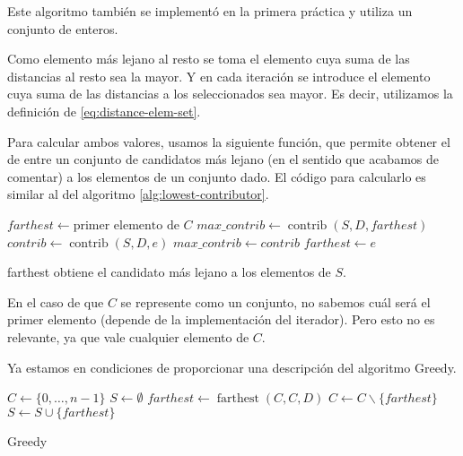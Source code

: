 \documentclass{article}
\begin{document}
Este algoritmo también se implementó en la primera práctica y utiliza un conjunto de enteros.

Como elemento más lejano al resto se toma el elemento cuya suma de las distancias al resto sea la mayor. Y en cada iteración se introduce el elemento
cuya suma de las distancias a los seleccionados sea mayor. Es decir, utilizamos la definición de \eqref{eq:distance-elem-set}.

Para calcular ambos valores, usamos la siguiente función, que permite obtener el de entre
un conjunto de candidatos más lejano (en el sentido que acabamos de comentar) a los elementos de un conjunto dado.
El código para calcularlo es similar al del algoritmo \ref{alg:lowest-contributor}.

\begin{algorithm}[H]
	\DontPrintSemicolon %
	$farthest \gets \text{primer elemento de } C$\;
	$max\_contrib \gets \operatorname{contrib}(S,D,farthest)$\;
	 {
		$contrib \gets \operatorname{contrib}(S,D,e)$\;
		 { 
			$max\_contrib \gets contrib$\;
			$farthest \gets e$ 
		}
	}
	\;
	\caption{{\sc farthest} obtiene el candidato más lejano a los elementos de $S$.}
	\label{alg:farthest-candidate-set}
\end{algorithm}

En el caso de que $C$ se represente como un conjunto, no sabemos cuál será el primer elemento (depende de la implementación del iterador). Pero
esto no es relevante, ya que vale cualquier elemento de $C$.

Ya estamos en condiciones de proporcionar una descripción del algoritmo Greedy.

\begin{algorithm}[H]
	\DontPrintSemicolon %
	$C \gets \{0,\ldots, n-1\}$ 
	$S \gets \emptyset$ 
	$farthest \gets \operatorname{farthest}(C,C,D)$ 
	$C \gets C\backslash \{farthest\}$\;
	$S \gets S\cup \{farthest\}$\;
	\;
	\;
	\caption{{\sc Greedy}}
	\label{alg:greedy}
\end{algorithm}
\end{document}
